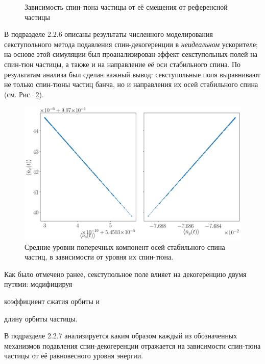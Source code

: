 \begin{figure}[H]
\begin{minipage}{.5\linewidth}
	\end{minipage}%
	\begin{minipage}{.5\linewidth}
	\caption{Зависимость спин-тюна частицы от её смещения от референсной частицы\label{fig:decoh:perfect}}
	\end{minipage}
\end{figure}

В подразделе 2.2.6 описаны результаты численного моделирования секступольного метода 
подавления спин-декогеренции в \emph{неидеальном} ускорителе; на основе этой симуляции был проанализирован
эффект секступольных полей на спин-тюн частицы, а также и на направление её оси стабильного спина. 
По результатам анализа был сделан важный вывод: секступольные поля выравнивают не только спин-тюны
частиц банча, но и направления их осей стабильного спина (см. Рис.~\ref{decoh:fig:nbar_vs_ST}).

\begin{figure}[H]\centering
	\includegraphics[height=.3\paperheight]{images/decoh_sim/mean_n_bar_vs_spin_tune}
	\caption{Средние уровни поперечных компонент осей стабильного спина частиц, в зависимости от уровня их спин-тюна.\label{decoh:fig:nbar_vs_ST}}
\end{figure}

Как было отмечено ранее, секступольное поле влияет на декогеренцию двумя путями: 
модифицируя 
\begin{enumerate*}[(1)] 
	\item коэффициент сжатия орбиты и 
	\item длину орбиты частицы.
\end{enumerate*}
В подразделе 2.2.7 анализируется каким образом каждый из обозначенных механизмов 
подавления спин-декогеренции отражается на зависимости спин-тюна частицы
от её равновесного уровня энергии.

